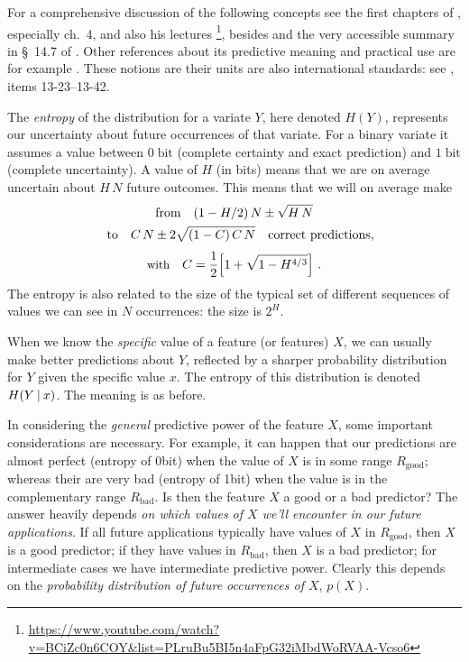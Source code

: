 \documentclass[\ifafour a4paper,12pt,\else a5paper,10pt,\fi%
onecolumn,oneside,article,%
british%
]{memoir}
\theoremstyle{remark}
\theoremstyle{innote}
\providecommand{\href}[2]{#2}
\renewcommand*{\|}[1][]{\nonscript\:#1\vert\nonscript\:\mathopen{}}
\newcommand*{\sect}{\S}%
\newcommand*{\chap}{ch.}%
\newcommand*{\bit}{\textrm{bit}}
\begin{document}
For a comprehensive discussion of the following concepts see the first
chapters of \textcite{mackay1995_r2005}, especially \chap~4, and also his
lectures
\footnote{\url{https://www.youtube.com/watch?v=BCiZc0n6COY&list=PLruBu5BI5n4aFpG32iMbdWoRVAA-Vcso6}},
besides \textcite{shannon1948} and the very accessible summary in
\sect~14.7 of \textcite{pressetal1986_r2007}. Other references about its
predictive meaning and practical use are for example
\textcite{lindley1956,kullback1959_r1978,woodward1953_r1964}. These notions
are their units are also international standards: see \textcite{iso2008c},
items 13-23--13-42.

The \emph{entropy} of the distribution for a variate $Y$, here denoted
$H(Y)$, represents our uncertainty about future occurrences of that
variate. For a binary variate it assumes a value between $0\;\bit$
(complete certainty and exact prediction) and $1\;\bit$ (complete
uncertainty). A value of $H$ (in bits) means that we are on average
uncertain about  $H\,N$ future outcomes. This means that we will on average make
\begin{multline}
  \label{eq:entropy_est}
    \text{from}\quad
    (1-H/2)\,N \pm \sqrt{H\,N}\\
    \shoveleft{
    \text{to}\quad    C\,N \pm 2\sqrt{(1-C)\,C\,N}
      \quad\text{correct predictions,}
      }
    \\[1\jot]
    \text{\small with}\quad C = \frac{1}{2}\Bigl[1+\sqrt{1-H^{4/3}}\Bigr] \ .
\end{multline}
The entropy is also related to the size of the typical
set of different sequences of values we can see in $N$ occurrences: the
size is $2^{H}$.

When we know the \emph{specific} value of a feature (or features) $X$, we
can usually make better predictions about $Y$, reflected by a sharper
probability distribution for $Y$ given the specific value $x$. The entropy
of this distribution is denoted $H(Y\|x)$. The meaning is as before.

In considering the \emph{general} predictive power of the feature $X$, some
important considerations are necessary. For example, it can happen that our
predictions are almost perfect (entropy of 0\;\bit) when the value of $X$
is in some range $R_{\text{good}}$; whereas their are very bad (entropy of
1\;\bit) when the value is in the complementary range $R_{\text{bad}}$. Is
then the feature $X$ a good or a bad predictor? The answer heavily depends
\emph{on which values of $X$ we'll encounter in our future applications}.
If all future applications typically have values of $X$ in
$R_{\text{good}}$, then $X$ is a good predictor; if they have values in
$R_{\text{bad}}$, then $X$ is a bad predictor; for intermediate cases we
have intermediate predictive power. Clearly this depends on the
\emph{probability distribution of future occurrences of $X$}, $p(X)$.
\end{document}
